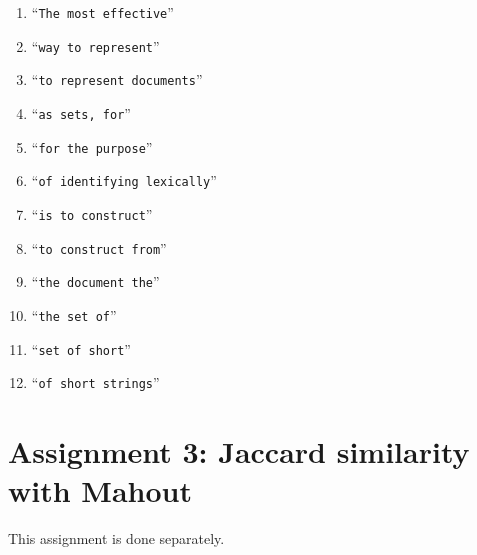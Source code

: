 \documentclass{article}
\begin{document}
\begin{enumerate}
{	\begin{enumerate}
	\item{\textquotedblleft\texttt{The most effective}\textquotedblright}
	\item{\textquotedblleft\texttt{way to represent}\textquotedblright}
	\item{\textquotedblleft\texttt{to represent documents}\textquotedblright}
	\item{\textquotedblleft\texttt{as sets, for}\textquotedblright}
	\item{\textquotedblleft\texttt{for the purpose}\textquotedblright}
	\item{\textquotedblleft\texttt{of identifying lexically}\textquotedblright}
	\item{\textquotedblleft\texttt{is to construct}\textquotedblright}
	\item{\textquotedblleft\texttt{to construct from}\textquotedblright}
	\item{\textquotedblleft\texttt{the document the}\textquotedblright}
	\item{\textquotedblleft\texttt{the set of}\textquotedblright}
	\item{\textquotedblleft\texttt{set of short}\textquotedblright}
	\item{\textquotedblleft\texttt{of short strings}\textquotedblright}
\end{enumerate}

}
\end{enumerate}

\section{Assignment 3: Jaccard similarity with Mahout}
This assignment is done separately.
\end{document}
